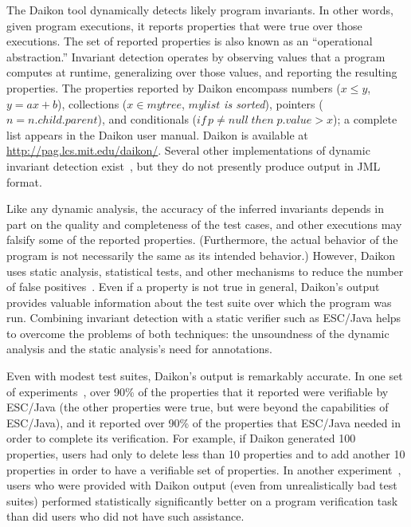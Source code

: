 The Daikon tool dynamically detects likely program invariants.  In
other words, given program executions, it reports properties that were
true over those executions.  The set of reported properties is also
known as an ``operational abstraction.''  Invariant detection operates
by observing values that a program computes at runtime, generalizing
over those values, and reporting the resulting properties.  The
properties reported by Daikon encompass numbers ($x \le y$, $y=ax+b$),
collections ($x \in \mathit{mytree}$, $\mathit{mylist}$ {\it is
  sorted\/}), pointers ($\mathit{n} = \mathit{n.child.parent}$),
and conditionals ($\mathit{if\,} p \neq \mathit{null\; then\; p.value}
> x$); a complete list appears in the Daikon user manual.  Daikon is
available at {\small\url{http://pag.lcs.mit.edu/daikon/}}.  Several
other implementations of dynamic invariant detection
exist~\cite{HangalL02,PytlikRKR2003,HenkelD2003}, but they do not
presently produce output in JML format.

Like any dynamic analysis, the accuracy of the inferred invariants
depends in part on the quality and completeness of the test cases, and
other executions may falsify some of the reported properties.
(Furthermore, the actual behavior of the program is not necessarily
the same as its intended behavior.)  However, Daikon uses static
analysis, statistical tests, and other mechanisms to reduce the number
of false positives~\cite{ErnstCGN2000:Relevance}.  Even if a property
is not true in general, Daikon's output provides valuable information
about the test suite over which the program was run.  Combining
invariant detection with a static verifier such as ESC/Java helps to
overcome the problems of both techniques: the unsoundness of the
dynamic analysis and the static analysis's need for annotations.

Even with modest test suites, Daikon's output is remarkably accurate.
In one set of experiments~\cite{NimmerE02:ISSTA}, over 90\% of the
properties that it reported were verifiable by ESC/Java (the other
properties were true, but were beyond the capabilities of ESC/Java),
and it reported over 90\% of the properties that ESC/Java needed in
order to complete its verification.  For example, if Daikon generated
100 properties, users had only to delete less than 10 properties and
to add another 10 properties in order to have a verifiable set of
properties.  In another experiment~\cite{NimmerE02:FSE}, users who
were provided with Daikon output (even from unrealistically bad test
suites) performed statistically significantly better on a program
verification task than did users who did not have such assistance.


